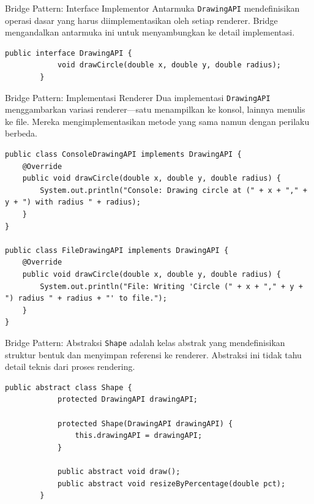 \documentclass[aspectratio=169, table]{beamer}
\begin{document}
\begin{frame}[fragile]{Bridge Pattern: Interface Implementor}
	\vspace{20pt}
	Antarmuka \texttt{DrawingAPI} mendefinisikan operasi dasar yang harus diimplementasikan oleh setiap renderer. 
	Bridge mengandalkan antarmuka ini untuk menyambungkan ke detail implementasi.
	
	\begin{lstlisting}[style=JavaStyle]
		public interface DrawingAPI {
			void drawCircle(double x, double y, double radius);
		}
	\end{lstlisting}
\end{frame}

\begin{frame}[fragile]{Bridge Pattern: Implementasi Renderer}
\vspace{20pt}
Dua implementasi \texttt{DrawingAPI} menggambarkan variasi renderer—satu menampilkan ke konsol, lainnya menulis ke file. 
Mereka mengimplementasikan metode yang sama namun dengan perilaku berbeda.

\begin{lstlisting}[style=JavaStyle]
public class ConsoleDrawingAPI implements DrawingAPI {
	@Override
	public void drawCircle(double x, double y, double radius) {
		System.out.println("Console: Drawing circle at (" + x + "," + y + ") with radius " + radius);
	}
}

public class FileDrawingAPI implements DrawingAPI {
	@Override
	public void drawCircle(double x, double y, double radius) {
		System.out.println("File: Writing 'Circle (" + x + "," + y + ") radius " + radius + "' to file.");
	}
}
\end{lstlisting}
\end{frame}

\begin{frame}[fragile]{Bridge Pattern: Abstraksi}
	\vspace{20pt}
	\texttt{Shape} adalah kelas abstrak yang mendefinisikan struktur bentuk dan menyimpan referensi ke renderer. 
	Abstraksi ini tidak tahu detail teknis dari proses rendering.
	
	\begin{lstlisting}[style=JavaStyle]
		public abstract class Shape {
			protected DrawingAPI drawingAPI;
			
			protected Shape(DrawingAPI drawingAPI) {
				this.drawingAPI = drawingAPI;
			}
			
			public abstract void draw();
			public abstract void resizeByPercentage(double pct);
		}
	\end{lstlisting}
\end{frame}
\end{document}
